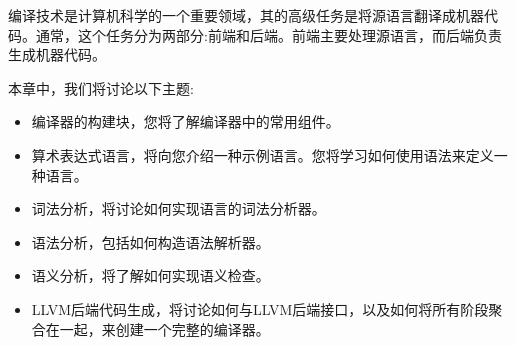 编译技术是计算机科学的一个重要领域，其的高级任务是将源语言翻译成机器代码。通常，这个任务分为两部分:前端和后端。前端主要处理源语言，而后端负责生成机器代码。\par

本章中，我们将讨论以下主题:\par

\begin{itemize}
	\item 编译器的构建块，您将了解编译器中的常用组件。
	\item 算术表达式语言，将向您介绍一种示例语言。您将学习如何使用语法来定义一种语言。
	\item 词法分析，将讨论如何实现语言的词法分析器。
	\item 语法分析，包括如何构造语法解析器。
	\item 语义分析，将了解如何实现语义检查。
	\item LLVM后端代码生成，将讨论如何与LLVM后端接口，以及如何将所有阶段聚合在一起，来创建一个完整的编译器。
\end{itemize}
